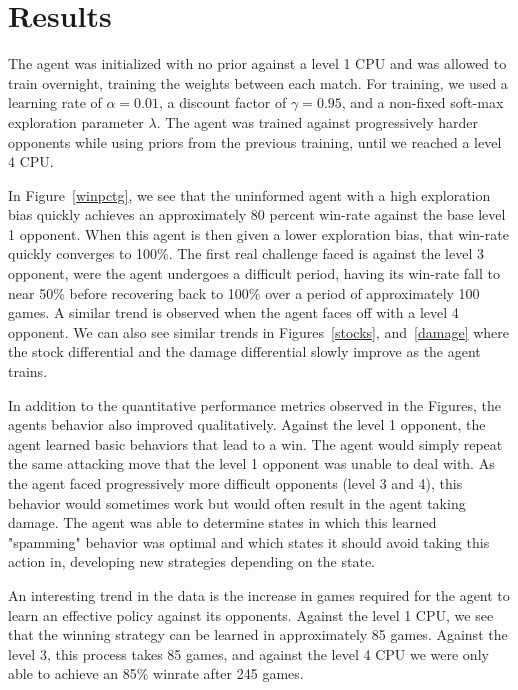 \section{Results}
The agent was initialized with no prior against a level 1 CPU and was allowed to train overnight, training the weights between each match. For training, we used a learning rate of $\alpha = 0.01$, a discount factor of $\gamma = 0.95$, and a non-fixed soft-max exploration parameter $\lambda$. The agent was trained against progressively harder opponents while using priors from the previous training, until we reached a level 4 CPU.

In Figure~\ref{winpctg}, we see that the uninformed agent with a high exploration bias quickly achieves an approximately 80 percent win-rate against the base level 1 opponent. When this agent is then given a lower exploration bias, that win-rate quickly converges to 100\%. The first real challenge faced is against the level 3 opponent, were the agent undergoes a difficult period, having its win-rate fall to near 50\% before recovering back to 100\% over a period of approximately 100 games. A similar trend is observed when the agent faces off with a level 4 opponent. We can also see similar trends in Figures~\ref{stocks}, and~\ref{damage} where the stock differential and the damage differential slowly improve as the agent trains. 

In addition to the quantitative performance metrics observed in the Figures, the agents behavior also improved qualitatively. Against the level 1 opponent, the agent learned basic behaviors that lead to a win. The agent would simply repeat the same attacking move that the level 1 opponent was unable to deal with. As the agent faced progressively more difficult opponents (level 3 and 4), this behavior would sometimes work but would often result in the agent taking damage. The agent was able to determine states in which this learned "spamming" behavior was optimal and which states it should avoid taking this action in, developing new strategies depending on the state.

An interesting trend in the data is the increase in games required for the agent to learn an effective policy against its opponents. Against the level 1 CPU, we see that the winning strategy can be learned in approximately 85 games. Against the level 3, this process takes 85 games, and against the level 4 CPU we were only able to achieve an 85\% winrate after 245 games. 




